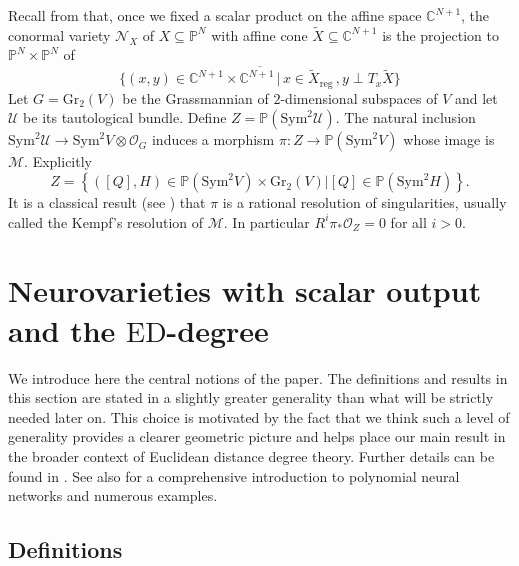 \documentclass[11pt]{article}
\numberwithin{equation}{section}
\numberwithin{figure}{section}
\theoremstyle{plain}
\theoremstyle{definition}
\theoremstyle{remark}
\newcommand{\su}{\subseteq}
\newcommand{\C}{\mathbb{C}}
\renewcommand{\P}{\mathbb{P}}
\newcommand{\Gr}{\mathrm{Gr}}
\newcommand{\ED}{\mathrm{ED}}
\begin{document}
Recall from \cite[Section 5]{DHOST} that, once we fixed a scalar product on the affine space $\C^{N+1}$, the conormal variety $\mathcal N _X$ of $X\su\P^{N}$ with affine cone $\tilde{X}\su \C^{N+1}$ is the projection to $\P^N \times\P^N$ of
\[
\overline{\{\left(x,y\right)\in\C^{N+1} \times\C^{N+1}\,\big| \,x\in \tilde{X}_\mathrm{reg}\, ,y\perp T_x \tilde{X}\} }
\]
Let $G=\Gr_2 \left( V \right)$ be the Grassmannian of $2$-dimensional
subspaces of $V$ and let $\mathcal{U}$ be its tautological bundle.
Define $Z=\P\left( \mathrm{Sym}^2 \mathcal{U} \right)$. The natural inclusion
$\mathrm{Sym}^2 \mathcal{U} \to \mathrm{Sym}^2 V \otimes \mathcal O_G$
induces a morphism $\pi: Z \to \P\left( \mathrm{Sym}^2 V \right)$ whose image is $\mathcal{M}$. Explicitly 
\begin{equation}\label{eq:KempfResolution}
Z=\left\{ \left( \left[ Q \right], H \right) \in \P\left( \mathrm{Sym}^2 V \right) \times\Gr_2 \left( V \right)  \big| \left[ Q \right] \in \P\left( \mathrm{Sym}^2 H \right)\right\}.
\end{equation}
It is a classical result (see \cite[Chapter 6]{Wey}) that $\pi$ is a
rational resolution of singularities, usually called the Kempf's resolution of $\mathcal M$. In particular $R^{i}\pi_{\ast}\mathcal{O}_{Z}=0$ for all $i>0$.

\section{Neurovarieties with scalar output and the $\ED$-degree}
\label{sec:neurovarieties}

We introduce here the central notions of the paper. The definitions and results in this section are stated in a slightly greater generality than what will be strictly needed later on. This choice is motivated by the fact that we think such a level of generality provides a clearer geometric picture and helps place our main result in the broader context of Euclidean distance degree theory. Further details can be found in \cite{KTB19, KMMT22, Sha24}. See also \cite{KLW24} for a comprehensive introduction to polynomial neural networks and numerous examples.

\subsection{Definitions}
\label{section:Definitions}
\end{document}
